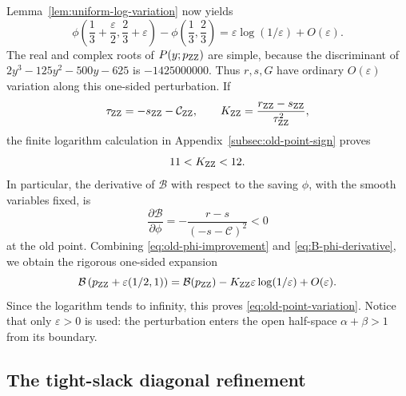 \documentclass[11pt,reqno,letterpaper]{amsart}
\numberwithin{equation}{section}
\theoremstyle{definition}
\theoremstyle{remark}
\begin{document}
Lemma~\ref{lem:uniform-log-variation} now yields
\begin{equation}\label{eq:old-phi-improvement}
 \phi\left(\frac13+\frac\varepsilon2,
            \frac23+\varepsilon\right)-
 \phi\left(\frac13,\frac23\right)
 =\varepsilon\log(1/\varepsilon)+O(\varepsilon).
\end{equation}
The real and complex roots of \(P(y;p_{\rm ZZ})\) are simple, because
the discriminant of \(2y^3-125y^2-500y-625\) is
\(-1425000000\).  Thus \(r,s,G\) have ordinary \(O(\varepsilon)\)
variation along this one-sided perturbation.  If
\[
 \tau_{\rm ZZ}=-s_{\rm ZZ}-\mathcal C_{\rm ZZ},\qquad
 K_{\rm ZZ}=\frac{r_{\rm ZZ}-s_{\rm ZZ}}{\tau_{\rm ZZ}^2},
\]
the finite logarithm calculation in
Appendix~\ref{subsec:old-point-sign} proves
\begin{equation}\label{eq:K-ZZ-rigorous-sign}
 11<K_{\rm ZZ}<12.
\end{equation}
In particular, the derivative of \(\mathcal B\) with respect to the
saving \(\phi\), with the smooth variables fixed, is
\begin{equation}\label{eq:B-phi-derivative}
 \frac{\partial\mathcal B}{\partial\phi}
 =-\frac{r-s}{(-s-\mathcal C)^2}<0
\end{equation}
at the old point.  Combining \eqref{eq:old-phi-improvement} and
\eqref{eq:B-phi-derivative}, we obtain the rigorous one-sided expansion
\begin{equation}\label{eq:old-B-improvement-expansion}
 \mathcal B\left(p_{\rm ZZ}+\varepsilon(1/2,1)\right)
 =\mathcal B(p_{\rm ZZ})
 -K_{\rm ZZ}\varepsilon\log(1/\varepsilon)+O(\varepsilon).
\end{equation}
Since the logarithm tends to infinity, this proves
\eqref{eq:old-point-variation}.  Notice that only
\(\varepsilon>0\) is used: the perturbation enters the open half-space
\(\alpha+\beta>1\) from its boundary.

\subsection{The tight-slack diagonal refinement}
\end{document}
